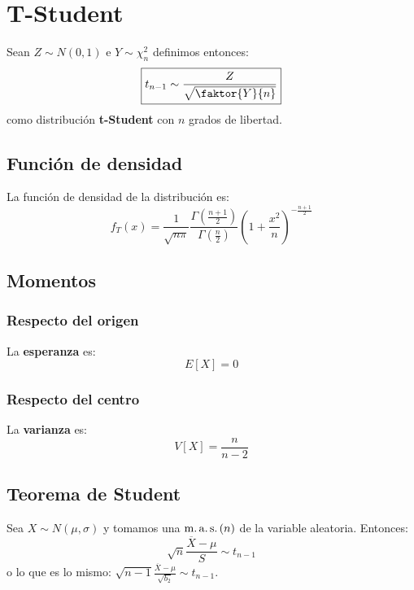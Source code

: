 \section{T-Student}
\label{sec:t_student}
Sean $Z \sim N\left( 0, 1 \right)$ e $Y \sim \chi^2_n$ definimos entonces:
\[
\boxed{t_{n-1} \sim \frac{Z}{\sqrt{\faktor{Y}{n}}}}
\]
como distribución \textbf{t-Student} con $n$ grados de libertad.

\subsection{Función de densidad}
La función de densidad de la distribución es:
\[
f_T \left( x \right) = \frac{1}{\sqrt{n \pi}}\frac{\Gamma\left( \frac{n + 1}{2} \right)}{\Gamma\left( \frac{n}{2} \right)} \left( 1 + \frac{x^2}{n} \right)^{-\frac{n+1}{2}}
\]

\subsection{Momentos}

\subsubsection*{Respecto del origen}
La \textbf{esperanza} es: 
\[
    E\left[ X \right] = 0
\]
\subsubsection*{Respecto del centro}
La \textbf{varianza} es:
\[
    V\left[ X \right] = \frac{n}{n-2}
\]

\subsection{Teorema de Student}
Sea $X \sim N\left( \mu, \sigma \right)$ y tomamos una $\operatorname{m.a.s.}\left( n \right)$ de la variable aleatoria. 
Entonces:
\[
\boxed{\sqrt{n}\frac{\overline{X} - \mu}{S} \sim t_{n-1}}
\]
o lo que es lo mismo: $\sqrt{n-1} \frac{\overline{X} - \mu}{\sqrt{b_2}} \sim t_{n-1}$.
